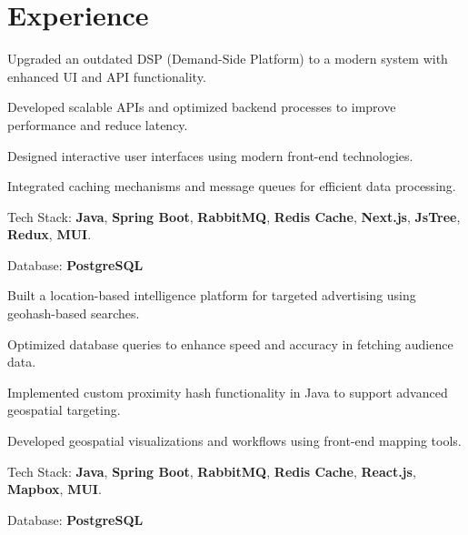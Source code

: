 \documentclass[]{azhagu-swe-resume-openfont}
\begin{document}
\begin{minipage}[t]{0.66\textwidth} 


\section{Experience}

\vspace{\topsep} %
\begin{tightemize}
\item Upgraded an outdated DSP (Demand-Side Platform) to a modern system with enhanced UI and API functionality.
\item Developed scalable APIs and optimized backend processes to improve performance and reduce latency.
\item Designed interactive user interfaces using modern front-end technologies.
\item Integrated caching mechanisms and message queues for efficient data processing.
\item Tech Stack: \textbf{Java}, \textbf{Spring Boot}, \textbf{RabbitMQ}, \textbf{Redis Cache}, \textbf{Next.js}, \textbf{JsTree}, \textbf{Redux}, \textbf{MUI}.
\item Database: \textbf{PostgreSQL}
\end{tightemize}
\sectionsep

\vspace{\topsep} %
\begin{tightemize}
 \item Built a location-based intelligence platform for targeted advertising using geohash-based searches.
\item Optimized database queries to enhance speed and accuracy in fetching audience data.
\item Implemented custom proximity hash functionality in Java to support advanced geospatial targeting.
\item Developed geospatial visualizations and workflows using front-end mapping tools.
\item Tech Stack: \textbf{Java}, \textbf{Spring Boot}, \textbf{RabbitMQ}, \textbf{Redis Cache}, \textbf{React.js}, \textbf{Mapbox}, \textbf{MUI}.
\item Database:  \textbf{PostgreSQL}
\end{tightemize}
\sectionsep


\end{minipage}
\end{document}
